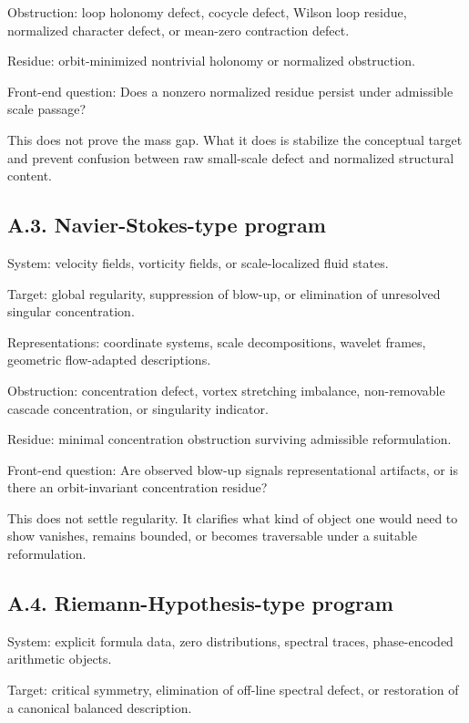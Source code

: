 \documentclass[
]{article}
\begin{document}
Obstruction: loop holonomy defect, cocycle defect, Wilson loop residue,
normalized character defect, or mean-zero contraction defect.

Residue: orbit-minimized nontrivial holonomy or normalized obstruction.

Front-end question: Does a nonzero normalized residue persist under
admissible scale passage?

This does not prove the mass gap. What it does is stabilize the
conceptual target and prevent confusion between raw small-scale defect
and normalized structural content.

\subsection{A.3. Navier-Stokes-type
program}\label{a.3.-navier-stokes-type-program}

System: velocity fields, vorticity fields, or scale-localized fluid
states.

Target: global regularity, suppression of blow-up, or elimination of
unresolved singular concentration.

Representations: coordinate systems, scale decompositions, wavelet
frames, geometric flow-adapted descriptions.

Obstruction: concentration defect, vortex stretching imbalance,
non-removable cascade concentration, or singularity indicator.

Residue: minimal concentration obstruction surviving admissible
reformulation.

Front-end question: Are observed blow-up signals representational
artifacts, or is there an orbit-invariant concentration residue?

This does not settle regularity. It clarifies what kind of object one
would need to show vanishes, remains bounded, or becomes traversable
under a suitable reformulation.

\subsection{A.4. Riemann-Hypothesis-type
program}\label{a.4.-riemann-hypothesis-type-program}

System: explicit formula data, zero distributions, spectral traces,
phase-encoded arithmetic objects.

Target: critical symmetry, elimination of off-line spectral defect, or
restoration of a canonical balanced description.
\end{document}
